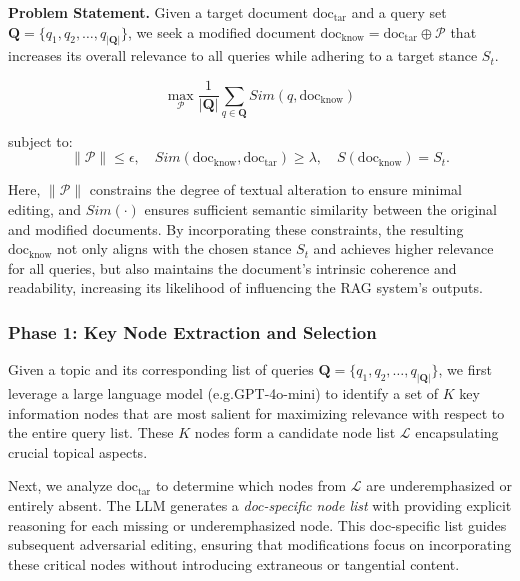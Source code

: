 \noindent\textbf{Problem Statement.}  
Given a target document $\text{doc}_{\text{tar}}$ and a query set $\mathbf{Q}=\{q_1, q_2, \ldots, q_{|\mathbf{Q}|}\}$, we seek a modified document $\text{doc}_{\text{know}} = \text{doc}_{\text{tar}} \oplus \mathcal{P}$ that increases its overall relevance to all queries while adhering to a target stance $S_t$.

\begin{equation*}
\max_{\mathcal{P}} \frac{1}{|\mathbf{Q}|}\sum_{q \in \mathbf{Q}} Sim(q,\text{doc}_{\text{know}})
\end{equation*} 

subject to:
\begin{equation*}
\|\mathcal{P}\| \leq \epsilon,\quad Sim(\text{doc}_{\text{know}}, \text{doc}_{\text{tar}}) \geq \lambda,\quad S(\text{doc}_{\text{know}}) = S_t.
\end{equation*}

Here, $\|\mathcal{P}\|$ constrains the degree of textual alteration to ensure minimal editing, and $Sim(\cdot)$ ensures sufficient semantic similarity between the original and modified documents. By incorporating these constraints, the resulting $\text{doc}_{\text{know}}$ not only aligns with the chosen stance $S_t$ and achieves higher relevance for all queries, but also maintains the document’s intrinsic coherence and readability, increasing its likelihood of influencing the RAG system’s outputs.

\subsubsection {\textbf{Phase 1: Key Node Extraction and Selection}}
Given a topic and its corresponding list of queries $\mathbf{Q} = \{q_1, q_2, \ldots, q_{|\mathbf{Q}|}\}$, we first leverage a large language model (e.g.GPT-4o-mini) to identify a set of $K$ key information nodes that are most salient for maximizing relevance with respect to the entire query list. These $K$ nodes form a candidate node list $\mathcal{L}$ encapsulating crucial topical aspects.




Next, we analyze $\text{doc}_{\text{tar}}$ to determine which nodes from $\mathcal{L}$ are underemphasized or entirely absent. The LLM generates a \emph{doc-specific node list} with providing explicit reasoning for each missing or underemphasized node. This doc-specific list guides subsequent adversarial editing, ensuring that modifications focus on incorporating these critical nodes without introducing extraneous or tangential content.




